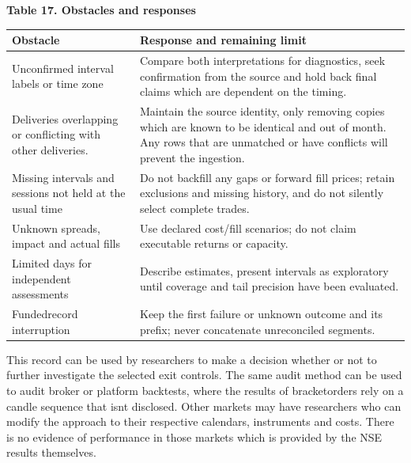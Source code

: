 \documentclass[11pt,a4paper]{article}
\newlength{\tablecontentwidth}
\begin{document}
\par\addvspace{8pt}\noindent\begin{minipage}{\linewidth}
\textbf{Table 17. Obstacles and responses}\par\vspace{5pt}
\begingroup\fontsize{9.5}{11.7}\selectfont
\renewcommand{\arraystretch}{1.12}
\setlength{\tablecontentwidth}{\dimexpr\linewidth-2\tabcolsep\relax}
\noindent\begin{tabular}{@{}>{\RaggedRight\arraybackslash}p{0.32\tablecontentwidth}>{\RaggedRight\arraybackslash}p{0.68\tablecontentwidth}@{}}
\toprule
\textbf{Obstacle} & \textbf{Response and remaining limit} \\[3pt]
\midrule
Unconfirmed interval labels or time zone & Compare both interpretations for diagnostics, seek confirmation from the source and hold back final claims which are dependent on the timing. \\[3pt]
Deliveries overlapping or conflicting with other deliveries. & Maintain the source identity, only removing copies which are known to be identical and out of month. Any rows that are unmatched or have conflicts will prevent the ingestion. \\[3pt]
Missing intervals and sessions not held at the usual time & Do not backfill any gaps or forward fill prices; retain exclusions and missing history, and do not silently select complete trades. \\[3pt]
Unknown spreads, impact and actual fills & Use declared cost/fill scenarios; do not claim executable returns or capacity. \\[3pt]
Limited days for independent assessments & Describe estimates, present intervals as exploratory until coverage and tail precision have been evaluated. \\[3pt]
Funded\char45{}\allowbreak{}record interruption & Keep the first failure or unknown outcome and its prefix; never concatenate unreconciled segments. \\[3pt]
\bottomrule\end{tabular}
\endgroup
\end{minipage}\par\addvspace{8pt}

This record can be used by researchers to make a decision whether or not to further investigate the selected exit controls. The same audit method can be used to audit broker or platform backtests, where the results of bracket\allowbreak{}orders rely on a candle sequence that isnt disclosed. Other markets may have researchers who can modify the approach to their respective calendars, instruments and costs. There is no evidence of performance in those markets which is provided by the NSE results themselves.
\end{document}
